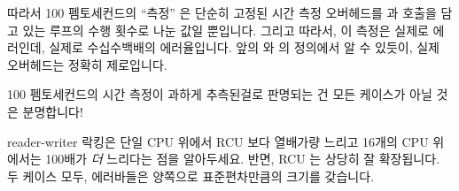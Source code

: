 {	따라서 100 펨토세컨드의 ``측정'' 은 단순히 고정된 시간 측정 오버헤드를
	 과  호출을 담고 있는 루프의
	수행 횟수로 나눈 값일 뿐입니다.
	그리고 따라서, 이 측정은 실제로 에러인데, 실제로 수십수백배의
	에러율입니다.
	앞의  와  의 정의에서 알 수
	있듯이, 실제 오버헤드는 정확히 제로입니다.

	100 펨토세컨드의 시간 측정이 과하게 추측된걸로 판명되는 건 모든
	케이스가 아닐 것은 분명합니다!

} \QuickQuizEnd

reader-writer 락킹은 단일 CPU 위에서 RCU 보다 열배가량 느리고 16개의 CPU
위에서는 100배가 \emph{더} 느리다는 점을 알아두세요.
반면, RCU 는 상당히 잘 확장됩니다.
두 케이스 모두, 에러바들은 양쪽으로 표준편차만큼의 크기를 갖습니다.


